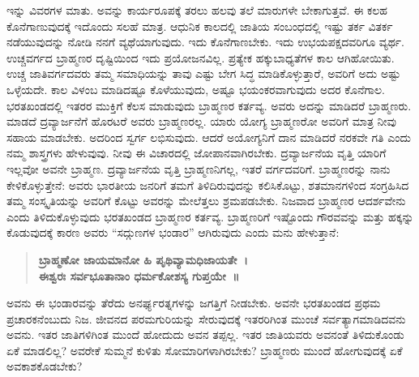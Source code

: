 \vskip 4pt

ಇನ್ನು ವಿವರಗಳ ಮಾತು. ಅವನ್ನು ಕಾರ್ಯರೂಪಕ್ಕೆ ತರಲು ಹಲವು ತಲೆ ಮಾರುಗಳೇ ಬೇಕಾಗುತ್ತವೆ. ಈ ಕಲಹ ಕೊನೆಗಾಣುವುದಕ್ಕೆ ಇದೊಂದು ಸಲಹೆ ಮಾತ್ರ. ಆಧುನಿಕ ಕಾಲದಲ್ಲಿ ಜಾತಿಯ ಸಂಬಂಧದಲ್ಲಿ ಇಷ್ಟು ತರ್ಕ ವಿತರ್ಕ ನಡೆಯುವುದನ್ನು ನೋಡಿ ನನಗೆ ವ್ಯಥೆಯಾಗುವುದು. ಇದು ಕೊನೆಗಾಣಬೇಕು. ಇದು ಉಭಯಪಕ್ಷದವರಿಗೂ ವ್ಯರ್ಥ. ಉಚ್ಚವರ್ಗದ ಬ್ರಾಹ್ಮಣರ ದೃಷ್ಟಿಯಿಂದ ಇದು ಪ್ರಯೋಜನವಿಲ್ಲ. ಪ್ರತ್ಯೇಕ ಹಕ್ಕುಬಾಧ್ಯತೆಗಳ ಕಾಲ ಆಗಿಹೋಯಿತು. ಉಚ್ಚ ಜಾತಿವರ್ಗದವರು ತಮ್ಮ ಸಮಾಧಿಯನ್ನು ತಾವು ಎಷ್ಟು ಬೇಗ ಸಿದ್ಧ ಮಾಡಿಕೊಳ್ಳುತ್ತಾರೆ, ಅವರಿಗೆ ಅದು ಅಷ್ಟು ಒಳ್ಳೆಯದೇ. ಕಾಲ ವಿಳಂಬ ಮಾಡಿದಷ್ಟೂ ಕೊಳೆಯುವುದು, ಅಷ್ಟೂ ಭಯಂಕರವಾಗುವುದು ಅದರ ಕೊನೆಗಾಲ. ಭರತಖಂಡದಲ್ಲಿ ಇತರರ ಮುಕ್ತಿಗೆ ಕೆಲಸ ಮಾಡುವುದು ಬ್ರಾಹ್ಮಣರ ಕರ್ತವ್ಯ. ಅವರು ಅದನ್ನು ಮಾಡಿದರೆ ಬ್ರಾಹ್ಮಣರು. ಮಾಡದೆ ದ್ರವ್ಯಾರ್ಜನೆಗೆ ಹೊರಟರೆ ಅವರು ಬ್ರಾಹ್ಮಣರಲ್ಲ. ಯಾರು ಯೋಗ್ಯ ಬ್ರಾಹ್ಮಣರೋ ಅವರಿಗೆ ಮಾತ್ರ ನೀವು ಸಹಾಯ ಮಾಡಬೇಕು. ಅದರಿಂದ ಸ್ವರ್ಗ ಲಭಿಸುವುದು. ಆದರೆ ಅಯೋಗ್ಯನಿಗೆ ದಾನ ಮಾಡಿದರೆ ನರಕವೇ ಗತಿ ಎಂದು ನಮ್ಮ ಶಾಸ್ತ್ರಗಳು ಹೇಳುವುವು. ನೀವು ಈ ವಿಚಾರದಲ್ಲಿ ಜೋಪಾನವಾಗಿರಬೇಕು. ದ್ರವ್ಯಾರ್ಜನೆಯ ವೃತ್ತಿ ಯಾರಿಗೆ ಇಲ್ಲವೋ ಅವನೇ ಬ್ರಾಹ್ಮಣ. ದ್ರವ್ಯಾರ್ಜನೆಯ ವೃತ್ತಿ ಬ್ರಾಹ್ಮಣನಿಗಲ್ಲ, ಇತರೆ ವರ್ಗದವರಿಗೆ. ಬ್ರಾಹ್ಮಣರನ್ನು ನಾನು ಕೇಳಿಕೊಳ್ಳುತ್ತೇನೆ: ಅವರು ಭಾರತೀಯ ಜನರಿಗೆ ತಮಗೆ ತಿಳಿದಿರುವುದನ್ನು ಕಲಿಸಿಕೊಟ್ಟು, ಶತಮಾನಗಳಿಂದ ಸಂಗ್ರಹಿಸಿದ ತಮ್ಮ ಸಂಸ್ಕೃತಿಯನ್ನು ಅವರಿಗೆ ಕೊಟ್ಟು ಅವರನ್ನು ಮೇಲೆತ್ತಲು ಶ್ರಮಪಡಬೇಕು. ನಿಜವಾದ ಬ್ರಾಹ್ಮಣರ ಆದರ್ಶವೇನು ಎಂದು ತಿಳಿದುಕೊಳ್ಳುವುದು ಭರತಖಂಡದ ಬ್ರಾಹ್ಮಣರ ಕರ್ತವ್ಯ. ಬ್ರಾಹ್ಮಣರಿಗೆ ಇಷ್ಟೊಂದು ಗೌರವವನ್ನು ಮತ್ತು ಹಕ್ಕನ್ನು ಕೊಡುವುದಕ್ಕೆ ಕಾರಣ ಅವರು “ಸದ್ಗುಣಗಳ ಭಂಡಾರ” ಆಗಿರುವುದು ಎಂದು ಮನು ಹೇಳುತ್ತಾನೆ:

\vskip 4pt

\begin{verse}
\textbf{ಬ್ರಾಹ್ಮಣೋ ಜಾಯಮಾನೋ ಹಿ ಪೃಥಿವ್ಯಾಮಧಿಜಾಯತೇ~।}\\\textbf{ಈಶ್ವರಃ ಸರ್ವಭೂತಾನಾಂ ಧರ್ಮಕೋಶಸ್ಯ ಗುಪ್ತಯೇ~॥}
\end{verse}


\newpage

ಅವನು ಈ ಭಂಡಾರವನ್ನು ತೆರೆದು ಅನರ್ಘ್ಯರತ್ನಗಳನ್ನು ಜಗತ್ತಿಗೆ ನೀಡಬೇಕು. ಅವನೇ ಭರತಖಂಡದ ಪ್ರಥಮ ಪ್ರಚಾರಕನೆಂಬುದು ನಿಜ. ಜೀವನದ ಪರಮಗುರಿಯನ್ನು ಸೇರುವುದಕ್ಕೆ ಇತರರಿಗಿಂತ ಮುಂಚೆ ಸರ್ವತ್ಯಾಗಮಾಡಿದವನು ಅವನು. ಇತರ ಜಾತಿಗಳಿಗಿಂತ ಮುಂದೆ ಹೋದುದು ಅವನ ತಪ್ಪಲ್ಲ. ಇತರ ಜಾತಿಯವರು ಅವನಂತೆ ತಿಳಿದುಕೊಂಡು ಏಕೆ ಮಾಡಲಿಲ್ಲ? ಅವರೇಕೆ ಸುಮ್ಮನೆ ಕುಳಿತು ಸೋಮಾರಿಗಳಾಗಿರಬೇಕು? ಬ್ರಾಹ್ಮಣರು ಮುಂದೆ ಹೋಗುವುದಕ್ಕೆ ಏಕೆ ಅವಕಾಶಕೊಡಬೇಕು?

\vskip 4pt

